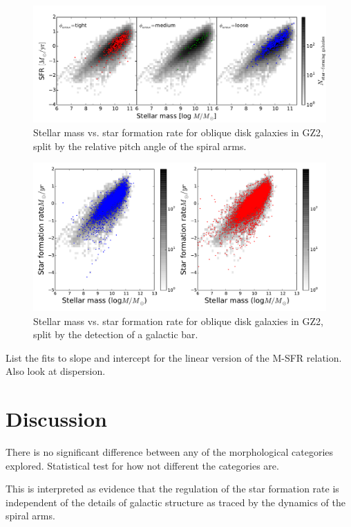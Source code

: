 \documentclass{emulateapj}
\begin{document}
\begin{figure}
\includegraphics[angle=0,width=7.0in]{figures/ms_arms_winding.pdf}
\caption{Stellar mass vs. star formation rate for oblique disk galaxies in GZ2, split by the relative pitch angle of the spiral arms. 
\label{fig-winding}}
\end{figure}

\begin{figure}
\includegraphics[angle=0,width=7.0in]{figures/ms_bar.pdf}
\caption{Stellar mass vs. star formation rate for oblique disk galaxies in GZ2, split by the detection of a galactic bar. 
\label{fig-bar}}
\end{figure}

List the fits to slope and intercept for the linear version of the M-SFR relation. Also look at dispersion. 


\section{Discussion}\label{sec-discussion}

There is no significant difference between any of the morphological categories explored. Statistical test for how not different the categories are. 

This is interpreted as evidence that the regulation of the star formation rate is independent of the details of galactic structure as traced by the dynamics of the spiral arms. 
\end{document}

